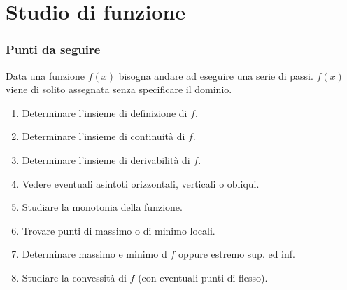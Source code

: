 \newpage
\section{Studio di funzione}
\subsubsection{Punti da seguire}
Data una funzione $f(x)$ bisogna andare ad eseguire una serie di passi. $f(x)$ viene di solito assegnata senza specificare il dominio.
\begin{enumerate}
    \item Determinare l'insieme di definizione di $f$.
    \item Determinare l'insieme di continuità di $f$.
    \item Determinare l'insieme di derivabilità di $f$.
    \item Vedere eventuali asintoti orizzontali, verticali o obliqui.
    \item Studiare la monotonia della funzione.
    \item Trovare punti di massimo o di minimo locali.
    \item Determinare massimo e minimo d $f$ oppure estremo sup. ed inf.
    \item Studiare la convessità di $f$ (con eventuali punti di flesso).
\end{enumerate}


